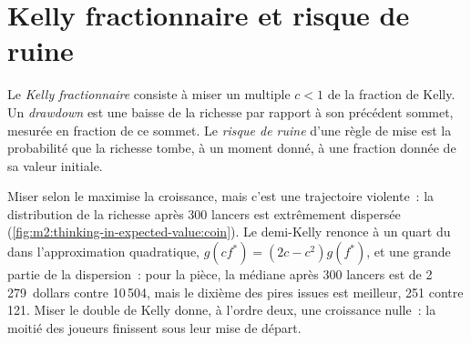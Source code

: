 \section{Kelly fractionnaire et risque de ruine}

\begin{definition}\label{def:m2:thinking-in-expected-value:frac}
Le \emph{Kelly fractionnaire} consiste à miser un multiple $c < 1$ de la
fraction de Kelly. Un \emph{drawdown} est une baisse de la richesse par rapport à son précédent sommet,
mesurée en fraction de ce sommet. Le \emph{risque de ruine} d'une règle de mise est
la probabilité que la richesse tombe, à un moment donné, à une fraction donnée de sa
valeur initiale.
\end{definition}

Miser selon le  maximise la croissance, mais c'est une trajectoire violente~: la distribution de la richesse
après 300 lancers est extrêmement dispersée (\cref{fig:m2:thinking-in-expected-value:coin}).
Le demi-Kelly renonce à un quart du  dans l'approximation quadratique, $g(cf^*)
= (2c - c^2)g(f^*)$, et une grande partie de la dispersion~: pour la pièce, la médiane après 300 lancers est
de 2\,279~dollars contre 10\,504, mais le dixième des pires issues est meilleur, 251 contre 121.
Miser le double de Kelly donne, à l'ordre deux, une croissance nulle~: la moitié des joueurs finissent sous leur mise de départ.

